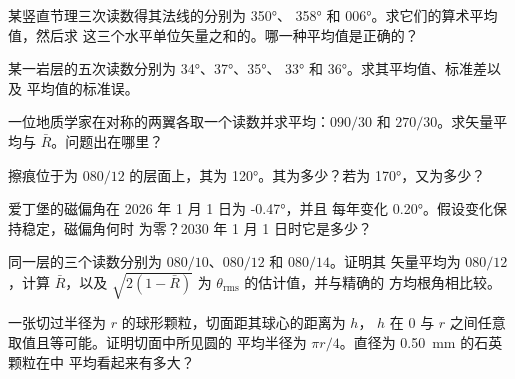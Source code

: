 \begin{exercise}[$\star$]\label{exo:b1:field-lab-methods-1:4}
某竖直节理三次读数得其法线的分别为 \ang{350}、
\ang{358} 和 \ang{006}。求它们的算术平均值，然后求
这三个水平单位矢量之和的。哪一种平均值是正确的？
\end{exercise}

\begin{exercise}[$\star\star$]\label{exo:b1:field-lab-methods-1:5}
某一岩层的五次读数分别为 \ang{34}、\ang{37}、\ang{35}、
\ang{33} 和 \ang{36}。求其平均值、标准差以及
平均值的标准误。
\end{exercise}

\begin{exercise}[$\star\star$]\label{exo:b1:field-lab-methods-1:6}
一位地质学家在对称的两翼各取一个读数并求平均：$090/30$
和 $270/30$。求矢量平均与 $\bar R$。问题出在哪里？
\end{exercise}

\begin{exercise}[$\star\star$]\label{exo:b1:field-lab-methods-1:7}
  擦痕位于为 $080/12$ 的层面上，其为
  \ang{120}。其为多少？若为 \ang{170}，又为多少？
\end{exercise}

\begin{exercise}[$\star\star$]\label{exo:b1:field-lab-methods-1:8}
爱丁堡的磁偏角在 2026 年 1 月 1 日为 \ang{-0.47}，并且
每年变化 \ang{+0.20}。假设变化保持稳定，磁偏角何时
为零？2030 年 1 月 1 日时它是多少？
\end{exercise}

\begin{exercise}[$\star\star$]\label{exo:b1:field-lab-methods-1:9}
同一层的三个读数分别为 $080/10$、$080/12$ 和 $080/14$。证明其
矢量平均为 $080/12$，计算 $\bar R$，以及
$\sqrt{2(1 - \bar R)}$ 为 $\theta_{\text{rms}}$ 的估计值，并与精确的
方均根角相比较。
\end{exercise}

\begin{exercise}[$\star\star\star$]\label{exo:b1:field-lab-methods-1:10}
一张切过半径为 $r$ 的球形颗粒，切面距其球心的距离为 $h$，
$h$ 在 0 与 $r$ 之间任意取值且等可能。证明切面中所见圆的
平均半径为 $\pi r/4$。直径为 \qty{0.50}{mm} 的石英颗粒在中
平均看起来有多大？
\end{exercise}


